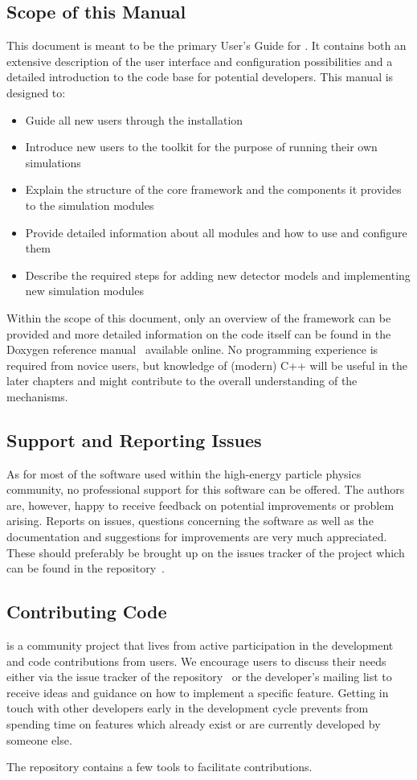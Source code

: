 \subsection{Scope of this Manual}
This document is meant to be the primary User's Guide for \apsq.
It contains both an extensive description of the user interface and configuration possibilities and a detailed introduction to the code base for potential developers.
This manual is designed to:
\begin{itemize}
\item Guide all new users through the installation
\item Introduce new users to the toolkit for the purpose of running their own simulations
\item Explain the structure of the core framework and the components it provides to the simulation modules
\item Provide detailed information about all modules and how to use and configure them
\item Describe the required steps for adding new detector models and implementing new simulation modules
\end{itemize}

Within the scope of this document, only an overview of the framework can be provided and more detailed information on the code itself can be found in the Doxygen reference manual~\cite{doxygen} available online.
No programming experience is required from novice users, but knowledge of (modern) C++ will be useful in the later chapters and might contribute to the overall understanding of the mechanisms.

\subsection{Support and Reporting Issues}
As for most of the software used within the high-energy particle physics community, no professional support for this software can be offered.
The authors are, however, happy to receive feedback on potential improvements or problem arising.
Reports on issues, questions concerning the software as well as the documentation and suggestions for improvements are very much appreciated.
These should preferably be brought up on the issues tracker of the project which can be found in the repository~\cite{ap2-issue-tracker}.


\subsection{Contributing Code}
\apsq is a community project that lives from active participation in the development and code contributions from users.
We encourage users to discuss their needs either via the issue tracker of the repository~\cite{ap2-issue-tracker} or the developer's mailing list to receive ideas and guidance on how to implement a specific feature.
Getting in touch with other developers early in the development cycle prevents from spending time on features which already exist or are currently developed by someone else.

The repository contains a few tools to facilitate contributions.
